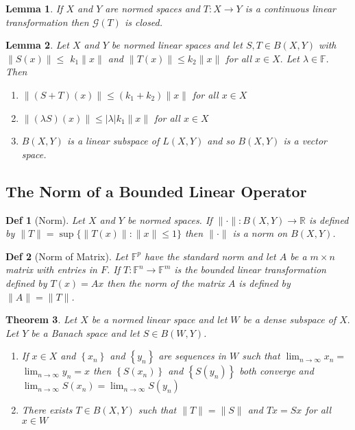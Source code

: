 \documentclass[10pt]{paper}
\newtheorem{theorem}{Theorem}[section]
\newtheorem{definition}{Def}[section]
\newtheorem{lemma}[theorem]{Lemma}
\begin{document}
\begin{lemma}
    If $X$ and $Y$ are normed spaces and $T: X \rightarrow Y$ is a continuous linear transformation then $\mathcal{G}(T)$ is closed.
\end{lemma}

\begin{lemma}
    Let $X$ and $Y$ be normed linear spaces and let $S, T \in B(X, Y)$ with $\|S(x)\| \leq$ $k_{1}\|x\|$ and $\|T(x)\| \leq k_{2}\|x\|$ for all $x \in X .$ Let $\lambda \in \mathbb{F} .$ Then
    \begin{enumerate}
        \item $\|(S+T)(x)\| \leq\left(k_{1}+k_{2}\right)\|x\|$ for all $x \in X$
        \item $\|(\lambda S)(x)\| \leq|\lambda| k_{1}\|x\|$ for all $x \in X$
        \item $B(X, Y)$ is a linear subspace of $L(X, Y)$ and so $B(X, Y)$ is a vector space.
    \end{enumerate}
\end{lemma}

\subsection{The Norm of a Bounded Linear Operator}

\begin{definition}[Norm]
    Let $X$ and $Y$ be normed spaces. If $\|\cdot\|: B(X, Y) \rightarrow \mathbb{R}$ is defined by $ \|T\|=\sup \{\|T(x)\|:\|x\| \leq 1\} $ then $\|\cdot\|$ is a norm on $B(X, Y)$.
\end{definition}

\begin{definition}[Norm of Matrix]
    Let $\mathbb{F}^{p}$ have the standard norm and let $A$ be a $m \times n$ matrix with entries in $F$. If $T: \mathbb{F}^{n} \rightarrow \mathbb{F}^{m}$ is the bounded linear transformation defined by $T(x)=A x$ then the norm of the matrix $A$ is defined by $\|A\|=\|T\|$.
\end{definition}

\begin{theorem}
    Let $X$ be a normed linear space and let $W$ be a dense subspace of $X .$ Let $Y$ be a Banach space and let $S \in B(W, Y)$.
    \begin{enumerate}
        \item If $x \in X$ and $\left\{x_{n}\right\}$ and $\left\{y_{n}\right\}$ are sequences in $W$ such that $\lim _{n \rightarrow \infty} x_{n}=$ $\lim _{n \rightarrow \infty} y_{n}=x$ then $\left\{S\left(x_{n}\right)\right\}$ and $\left\{S\left(y_{n}\right)\right\}$ both converge and $\lim _{n \rightarrow \infty} S\left(x_{n}\right) = \lim _{n \rightarrow \infty} S\left(y_{n}\right)
              $
        \item There exists $T \in B(X, Y)$ such that $\|T\|=\|S\|$ and $T x=S x$ for all $x \in W$
    \end{enumerate}
\end{theorem}
\end{document}
